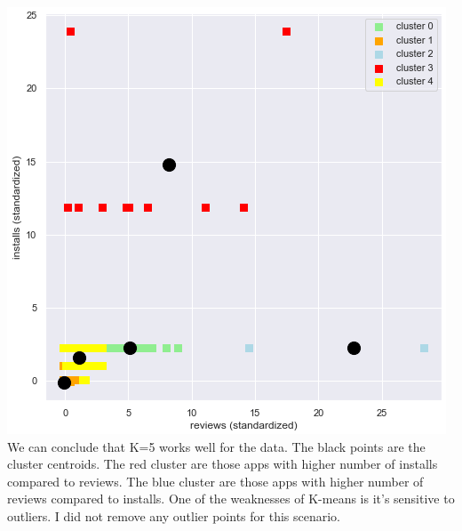 \documentclass[11pt]{article}
\begin{document}
\includegraphics[scale=0.65]{kmeans6} \\ 

We can conclude that K=5 works well for the data. The black points are the cluster centroids. The red cluster are those apps with higher number of installs compared to reviews. The blue cluster are those apps with higher number of reviews compared to installs. One of the weaknesses of K-means is it's sensitive to outliers. I did not remove any outlier points for this scenario.
\end{document}
